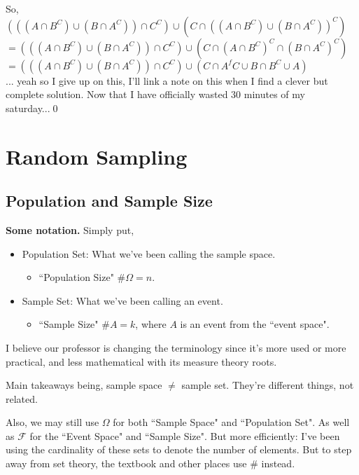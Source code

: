 \documentclass[12pt]{book}
\begin{document}
\noindent So, \\
$(((A\cap B^{C}) \cup (B \cap A^{C}))\cap C^{C}) \cup (C \cap ((A\cap B^{C}) \cup (B \cap A^{C}))^{C})$\\
$=(((A\cap B^{C}) \cup (B \cap A^{C}))\cap C^{C}) \cup (C \cap (A\cap B^{C})^{C} \cap (B \cap A^{C})^{C})$\\
$=(((A\cap B^{C}) \cup (B \cap A^{C}))\cap C^{C}) \cup (C \cap A^f{C} \cup B \cap B^{C} \cup A)$\\

\noindent ... yeah so I give up on this, I'll link a note on this when I find a clever but complete solution. Now that I have officially wasted 30 minutes of my saturday...\qed\\





\section{Random Sampling }
\subsection{Population and Sample Size}

\textbf{Some notation.}
Simply put, 
\begin{itemize}
\item Population Set: What we've been calling the sample space.
	\begin{itemize}\item``Population Size" $\# \Omega = n$.\end{itemize}
\item Sample Set: What we've been calling an event.
	\begin{itemize}\item``Sample Size" $\# A = k$, where $A$ is an event from the ``event space".\end{itemize}
\end{itemize}

I believe our professor is changing the terminology since it's more used or more practical, and less mathematical with its measure theory roots.

Main takeaways being, sample space $\neq$ sample set. They're different things, not related.

Also, we may still use $\Omega$ for both ``Sample Space" and ``Population Set".
As well as $\mathcal{F}$ for the ``Event Space" and ``Sample Size".
But more efficiently: I've been using the cardinality of these sets to denote the number of elements. But to step away from set theory, the textbook and other places use $\#$ instead.\\
\end{document}
